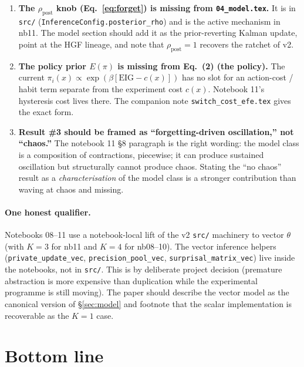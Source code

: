 \documentclass[11pt,a4paper]{article}
\theoremstyle{plain}
\begin{document}
\begin{enumerate}\itemsep2pt
\item \textbf{The $\rho_{\text{post}}$ knob (Eq.~\eqref{eq:forget})
is missing from \texttt{04\_model.tex}.} It is in \texttt{src/}
(\texttt{InferenceConfig.posterior\_rho}) and is the active mechanism
in nb11. The model section should add it as the prior-reverting Kalman
update, point at the HGF lineage, and note that
$\rho_{\text{post}}=1$ recovers the ratchet of v2.

\item \textbf{The policy prior $E(\pi)$ is missing from
Eq.~(2) (the policy).} The current
$\pi_i(x)\propto\exp(\beta[\mathrm{EIG}-c(x)])$ has no slot for an
action-cost / habit term separate from the experiment cost $c(x)$.
Notebook 11's hysteresis cost lives there. The companion note
\texttt{switch\_cost\_efe.tex} gives the exact form.

\item \textbf{Result \#3 should be framed as ``forgetting-driven
oscillation,'' not ``chaos.''} The notebook 11 §8 paragraph is the
right wording: the model class is a composition of contractions,
piecewise; it can produce sustained oscillation but structurally
cannot produce chaos. Stating the ``no chaos'' result as a
\emph{characterisation} of the model class is a stronger contribution
than waving at chaos and missing.
\end{enumerate}

\paragraph{One honest qualifier.} Notebooks 08--11 use a
notebook-local lift of the v2 \texttt{src/} machinery to vector
$\theta$ (with $K=3$ for nb11 and $K=4$ for nb08--10). The vector
inference helpers (\texttt{private\_update\_vec},
\texttt{precision\_pool\_vec}, \texttt{surprisal\_matrix\_vec}) live
inside the notebooks, not in \texttt{src/}. This is by deliberate
project decision (premature abstraction is more expensive than
duplication while the experimental programme is still moving). The
paper should describe the vector model as the canonical version of
§\ref{sec:model} and footnote that the scalar implementation is
recoverable as the $K=1$ case.

\section{Bottom line}
\end{document}
